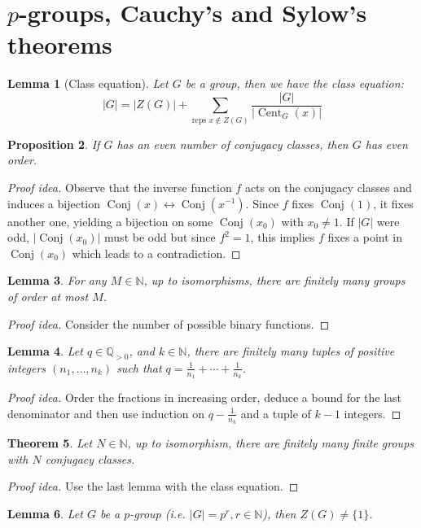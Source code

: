 \documentclass[paper=a4, fontsize=12pt]{scrartcl} %
\newtheorem{thm}{Theorem}[section]
\newtheorem{prop}[thm]{Proposition}
\newtheorem{lem}[thm]{Lemma}
\theoremstyle{definition}
\theoremstyle{remark}
\newcommand{\N}{\mathbb{N}}
\newcommand{\Q}{\mathbb{Q}}
\DeclareMathOperator{\cent}{Cent}
\DeclareMathOperator{\conjc}{Conj}
\numberwithin{equation}{section} %
\numberwithin{figure}{section} %
\numberwithin{table}{section} %
\begin{document}
\section{$p$-groups, Cauchy's and Sylow's theorems}
\begin{lem}[Class equation]
	Let $G$ be a group, then we have the class equation:
	\[|G| = |Z(G)| + \sum_{\text{reps }x \notin Z(G)} \frac{|G|}{|\cent_G(x)|}\]
\end{lem}
\begin{prop}
	If $G$ has an even number of conjugacy classes, then $G$ has even order.
\end{prop}
\begin{proof}[Proof idea]
	Observe that the inverse function $f$ acts on the conjugacy classes and induces a bijection $\conjc(x) \leftrightarrow \conjc(x^{-1})$. Since $f$ fixes $\conjc(1)$, it fixes another one, yielding a bijection on some $\conjc(x_0)$ with $x_0 \neq 1$. If $|G|$ were odd, $|\conjc(x_0)|$ must be odd but since $f^2 = 1$, this implies $f$ fixes a point in $\conjc(x_0)$ which leads to a contradiction. 
\end{proof}
\begin{lem}
	For any $M \in \N$, up to isomorphisms, there are finitely many groups of order at most $M$.
\end{lem}
\begin{proof}[Proof idea]
	Consider the number of possible binary functions.
\end{proof}
\begin{lem}
	Let $q \in \Q_{> 0}$, and $k \in \N$, there are finitely many tuples of positive integers $(n_1, \dots, n_k)$ such that $q = \frac{1}{n_1} + \cdots + \frac{1}{n_k}$.
\end{lem}
\begin{proof}[Proof idea]
	Order the fractions in increasing order, deduce a bound for the last denominator and then use induction on $q-\frac{1}{n_k}$ and a tuple of $k-1$ integers.
\end{proof}
\begin{thm}
	Let $N \in \N$, up to isomorphism, there are finitely many finite groups with $N$ conjugacy classes.
\end{thm}
\begin{proof}[Proof idea]
	Use the last lemma with the class equation.
\end{proof}
\begin{lem}
	Let $G$ be a $p$-group (i.e. $|G| = p^r, r \in \N$), then $Z(G) \neq \{1\}$.
\end{lem}
\end{document}
